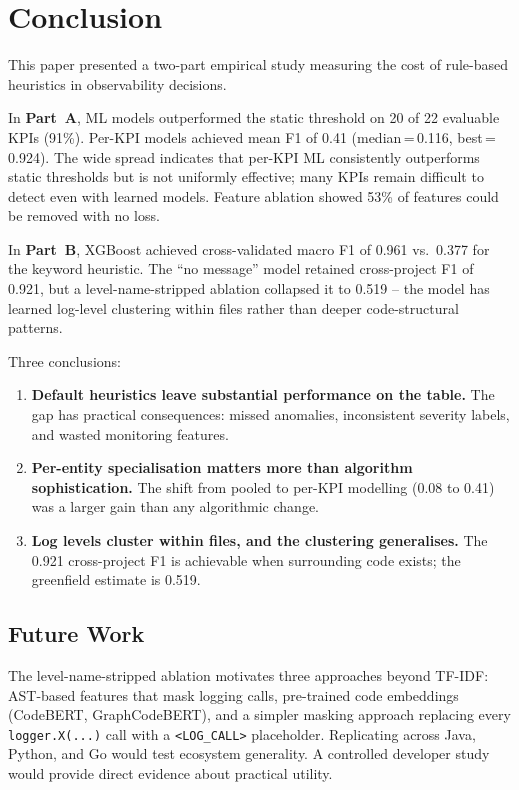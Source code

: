 \documentclass[10pt,twocolumn]{article}
\begin{document}
\section{Conclusion}
\label{sec:conclusion}

This paper presented a two-part empirical study measuring the cost of rule-based heuristics in observability decisions.

In \textbf{Part~A}, ML models outperformed the static threshold on 20 of 22 evaluable KPIs (91\%). Per-KPI models achieved mean F1 of 0.41 (median\,=\,0.116, best\,=\,0.924). The wide spread indicates that per-KPI ML consistently outperforms static thresholds but is not uniformly effective; many KPIs remain difficult to detect even with learned models. Feature ablation showed 53\% of features could be removed with no loss.

In \textbf{Part~B}, XGBoost achieved cross-validated macro F1 of 0.961 vs.\ 0.377 for the keyword heuristic. The ``no message'' model retained cross-project F1 of 0.921, but a level-name-stripped ablation collapsed it to 0.519 -- the model has learned log-level clustering within files rather than deeper code-structural patterns.

Three conclusions:

\begin{enumerate}
  \item \textbf{Default heuristics leave substantial performance on the table.} The gap has practical consequences: missed anomalies, inconsistent severity labels, and wasted monitoring features.

  \item \textbf{Per-entity specialisation matters more than algorithm sophistication.} The shift from pooled to per-KPI modelling (0.08 to 0.41) was a larger gain than any algorithmic change.

  \item \textbf{Log levels cluster within files, and the clustering generalises.} The 0.921 cross-project F1 is achievable when surrounding code exists; the greenfield estimate is 0.519.
\end{enumerate}

\subsection*{Future Work}

The level-name-stripped ablation motivates three approaches beyond TF-IDF: AST-based features that mask logging calls, pre-trained code embeddings (CodeBERT, GraphCodeBERT), and a simpler masking approach replacing every \texttt{logger.X(...)} call with a \texttt{<LOG\_CALL>} placeholder. Replicating across Java, Python, and Go would test ecosystem generality. A controlled developer study would provide direct evidence about practical utility.
\end{document}
